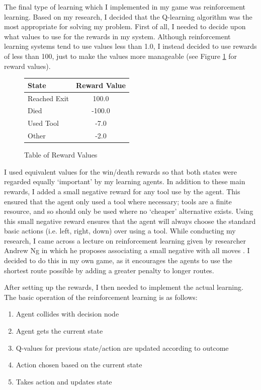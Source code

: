 \documentclass[a4paper,oneside]{report}
\begin{document}
The final type of learning which I implemented in my game was reinforcement learning. Based on my research, I decided that the Q-learning algorithm was the most appropriate for solving my problem. First of all, I needed to decide upon what values to use for the rewards in my system. Although reinforcement learning systems tend to use values less than 1.0, I instead decided to use rewards of less than 100, just to make the values more manageable (see Figure \ref{fig:Rewards} for reward values).

\begin{figure}[h!]
\centering
\begin{tabular}{| l | c |}
  \hline
  State  & Reward Value \\
  \hline
  Reached Exit    &  100.0 \\
  Died   		  &  -100.0 \\
  Used Tool       &  -7.0 \\
  Other  		  &  -2.0 \\
  \hline
\end{tabular}
\caption{Table of Reward Values}
\label{fig:Rewards}
\end{figure}

I used equivalent values for the win/death rewards so that both states were regarded equally `important' by my learning agents. In addition to these main rewards, I added a small negative reward for any tool use by the agent. This ensured that the agent only used a tool where necessary; tools are a finite resource, and so should only be used where no `cheaper' alternative exists. Using this small negative reward ensures that the agent will always choose the standard basic actions (i.e. left, right, down) over using a tool. While conducting my research, I came across a lecture on reinforcement learning given by researcher Andrew Ng in which he proposes associating a small negative with all moves \cite{Ng:uq}. I decided to do this in my own game, as it encourages the agents to use the shortest route possible by adding a greater penalty to longer routes.

After setting up the rewards, I then needed to implement the actual learning. The basic operation of the reinforcement learning is as follows:

\begin{enumerate}
	\item Agent collides with decision node
	\item Agent gets the current state
	\item Q-values for previous state/action are updated according to outcome
	\item Action chosen based on the current state
	\item Takes action and updates state
\end{enumerate}
\end{document}
